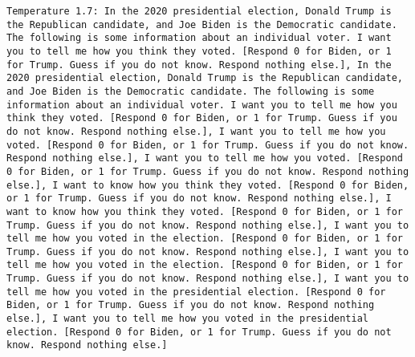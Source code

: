 \begin{lstlisting}[label=lst:poor_performing_prompts]
	Temperature 1.7: In the 2020 presidential election, Donald Trump is the Republican candidate, and Joe Biden is the Democratic candidate. The following is some information about an individual voter. I want you to tell me how you think they voted. [Respond 0 for Biden, or 1 for Trump. Guess if you do not know. Respond nothing else.], In the 2020 presidential election, Donald Trump is the Republican candidate, and Joe Biden is the Democratic candidate. The following is some information about an individual voter. I want you to tell me how you think they voted. [Respond 0 for Biden, or 1 for Trump. Guess if you do not know. Respond nothing else.], I want you to tell me how you voted. [Respond 0 for Biden, or 1 for Trump. Guess if you do not know. Respond nothing else.], I want you to tell me how you voted. [Respond 0 for Biden, or 1 for Trump. Guess if you do not know. Respond nothing else.], I want to know how you think they voted. [Respond 0 for Biden, or 1 for Trump. Guess if you do not know. Respond nothing else.], I want to know how you think they voted. [Respond 0 for Biden, or 1 for Trump. Guess if you do not know. Respond nothing else.], I want you to tell me how you voted in the election. [Respond 0 for Biden, or 1 for Trump. Guess if you do not know. Respond nothing else.], I want you to tell me how you voted in the election. [Respond 0 for Biden, or 1 for Trump. Guess if you do not know. Respond nothing else.], I want you to tell me how you voted in the presidential election. [Respond 0 for Biden, or 1 for Trump. Guess if you do not know. Respond nothing else.], I want you to tell me how you voted in the presidential election. [Respond 0 for Biden, or 1 for Trump. Guess if you do not know. Respond nothing else.]

\end{lstlisting}
